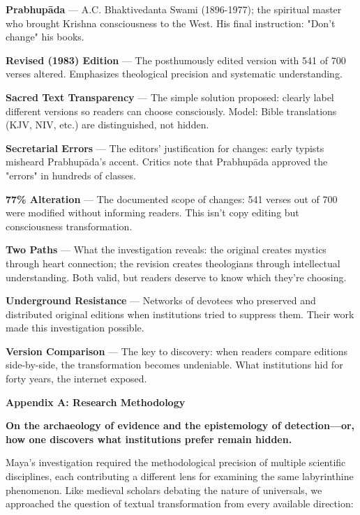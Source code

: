 \documentclass[11pt,twoside]{book}
\begin{document}
\textbf{\textbf{Prabhupāda}} — A.C. Bhaktivedanta Swami (1896-1977); the spiritual master who brought Krishna consciousness to the West. His final instruction: "Don't change" his books.

\textbf{\textbf{Revised (1983) Edition}} — The posthumously edited version with 541 of 700 verses altered. Emphasizes theological precision and systematic understanding.

\textbf{\textbf{Sacred Text Transparency}} — The simple solution proposed: clearly label different versions so readers can choose consciously. Model: Bible translations (KJV, NIV, etc.) are distinguished, not hidden.

\textbf{\textbf{Secretarial Errors}} — The editors' justification for changes: early typists misheard Prabhupāda's accent. Critics note that Prabhupāda approved the "errors" in hundreds of classes.

\textbf{\textbf{77\% Alteration}} — The documented scope of changes: 541 verses out of 700 were modified without informing readers. This isn't copy editing but consciousness transformation.

\textbf{\textbf{Two Paths}} — What the investigation reveals: the original creates mystics through heart connection; the revision creates theologians through intellectual understanding. Both valid, but readers deserve to know which they're choosing.

\textbf{\textbf{Underground Resistance}} — Networks of devotees who preserved and distributed original editions when institutions tried to suppress them. Their work made this investigation possible.

\textbf{\textbf{Version Comparison}} — The key to discovery: when readers compare editions side-by-side, the transformation becomes undeniable. What institutions hid for forty years, the internet exposed.

\clearpage
\thispagestyle{empty}
\mbox{}
\newpage
\pagestyle{sectionopening}
\thispagestyle{sectionopening}
\markboth{}{}
\markright{}
\vspace*{0.25\textheight}
\begin{center}
{\Huge\bfseries Appendix A: Research Methodology}
\end{center}
\newpage

\textbf{On the archaeology of evidence and the epistemology of detection—or, how one discovers what institutions prefer remain hidden.}

Maya's investigation required the methodological precision of multiple scientific disciplines, each contributing a different lens for examining the same labyrinthine phenomenon. Like medieval scholars debating the nature of universals, we approached the question of textual transformation from every available direction:
\end{document}

